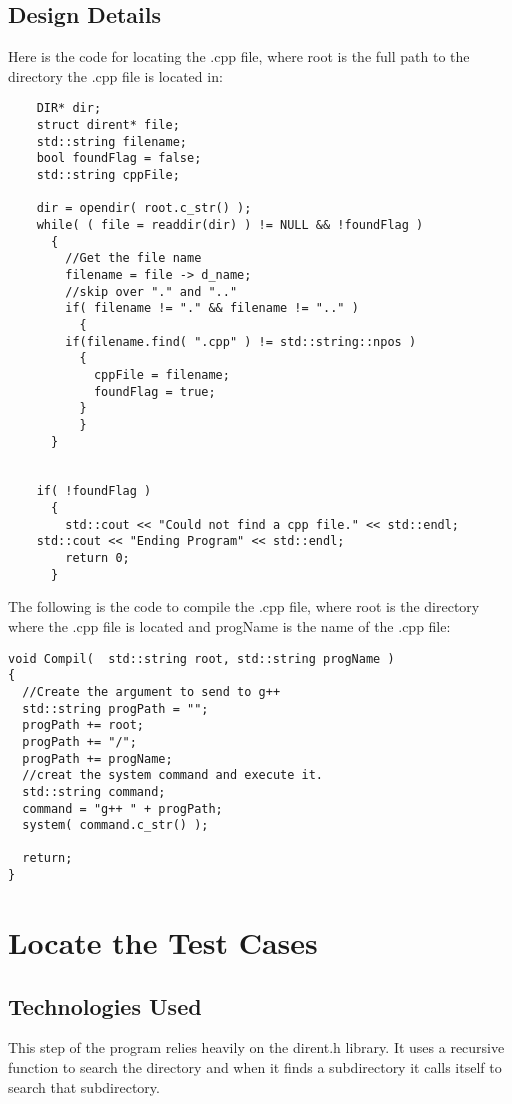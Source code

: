 \subsection{Design Details}
Here is the code for locating the .cpp file, where root is the full path to the directory the .cpp file is located in:
\begin{lstlisting}
    DIR* dir;
    struct dirent* file;
    std::string filename;
    bool foundFlag = false;
    std::string cppFile;

    dir = opendir( root.c_str() );
    while( ( file = readdir(dir) ) != NULL && !foundFlag )
      {
        //Get the file name
        filename = file -> d_name;
        //skip over "." and ".."
        if( filename != "." && filename != ".." )
          {
        if(filename.find( ".cpp" ) != std::string::npos )
          {
            cppFile = filename;
            foundFlag = true;
          }
          }
      }


    if( !foundFlag )
      {
        std::cout << "Could not find a cpp file." << std::endl;
	std::cout << "Ending Program" << std::endl;
        return 0;
      }
\end{lstlisting}

The following is the code to compile the .cpp file, where root is the directory where the .cpp file is located
and progName is the name of the .cpp file:
\begin{lstlisting}
void Compil(  std::string root, std::string progName )
{
  //Create the argument to send to g++
  std::string progPath = "";
  progPath += root;
  progPath += "/";
  progPath += progName;
  //creat the system command and execute it.
  std::string command;
  command = "g++ " + progPath;
  system( command.c_str() );
 
  return;
}
\end{lstlisting}



\section{Locate the Test Cases }

\subsection{Technologies  Used}
This step of the program relies heavily on the dirent.h library.  It uses a recursive function to search the directory and when
it finds a subdirectory it calls itself to search that subdirectory.


